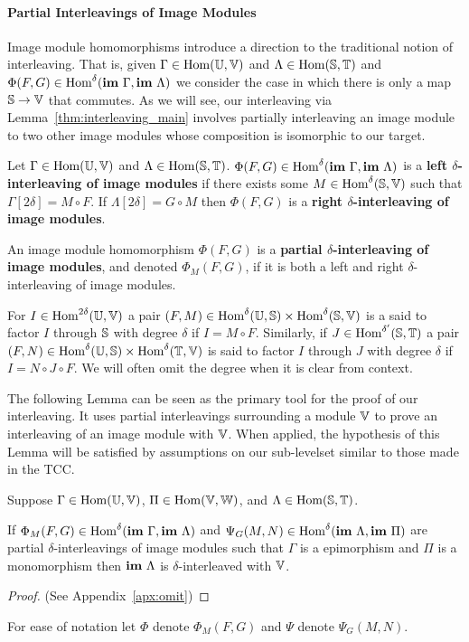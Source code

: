 \paragraph{Partial Interleavings of Image Modules}

Image module homomorphisms introduce a direction to the traditional notion of interleaving.
That is, given $\Gamma\in\Hom(\U,\V)$ and $\Lambda\in\Hom(\S,\T)$ and $\Phi(F, G)\in\Hom^\delta(\im~\Gamma, \im~\Lambda)$ we consider the case in which there is only a map $\S\to\V$ that commutes.
As we will see, our interleaving via Lemma~\ref{thm:interleaving_main} involves partially interleaving an image module to two other image modules whose composition is isomorphic to our target.

\begin{definition}
  Let $\Gamma\in\Hom(\U,\V)$ and $\Lambda\in\Hom(\S,\T)$.
  $\Phi(F, G)\in\Hom^\delta(\im~\Gamma,\im~\Lambda)$ is a \textbf{left $\delta$-interleaving of image modules} if there exists some $M\in\Hom^\delta(\S,\V)$ such that $\Gamma[2\delta] = M\circ F$.
  If $\Lambda[2\delta] = G\circ M$ then $\Phi(F, G)$ is a \textbf{right $\delta$-interleaving of image modules}.

  An image module homomorphism $\Phi(F, G)$ is a \textbf{partial $\delta$-interleaving of image modules}, and denoted $\Phi_M(F, G)$, if it is both a left and right $\delta$-interleaving of image modules.
\end{definition}

For $I\in\Hom^{2\delta}(\U,\V)$ a pair $(F, M)\in \Hom^\delta(\U,\S)\times\Hom^\delta(\S,\V)$ is a said to factor $I$ through $\S$ with degree $\delta$ if $I = M\circ F$.
Similarly, if $J\in\Hom^{\delta'}(\S,\T)$ a pair $(F,N)\in\Hom^\delta(\U,\S)\times\Hom^\delta(\T,\V)$ is said to factor $I$ through $J$ with degree $\delta$ if $I = N\circ J\circ F$.
We will often omit the degree when it is clear from context.

The following Lemma can be seen as the primary tool for the proof of our interleaving.
It uses partial interleavings surrounding a module $\V$ to prove an interleaving of an image module with $\V$.
When applied, the hypothesis of this Lemma will be satisfied by assumptions on our sub-levelset similar to those made in the TCC.

\begin{lemma}\label{thm:interleaving_main}
  Suppose $\Gamma\in\Hom(\U,\V)$, $\Pi\in\Hom(\V,\W)$, and $\Lambda\in\Hom(\S, \T)$.

  If $\Phi_M(F, G)\in\Hom^\delta(\im~\Gamma, \im~\Lambda)$ and $\Psi_G(M, N)\in\Hom^\delta(\im~\Lambda, \im~\Pi)$ are partial $\delta$-interleavings of image modules such that $\Gamma$ is a epimorphism and $\Pi$ is a monomorphism then $\im~\Lambda$ is $\delta$-interleaved with $\V$.
\end{lemma}
\begin{proof}
  (See Appendix~\ref{apx:omit})
\end{proof}
\proofatend
  For ease of notation let $\Phi$ denote $\Phi_M(F, G)$ and $\Psi$ denote $\Psi_G(M, N)$.

